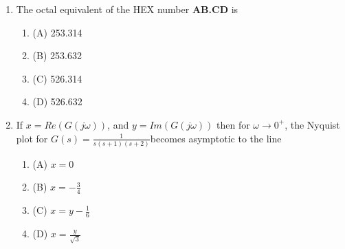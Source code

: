 \documentclass[journal]{IEEEtran}
\numberwithin{equation}{enumi}
\numberwithin{figure}{enumi}
\begin{document}
\begin{enumerate}
\begin{multicols}{4}
\begin{enumerate}
        \item $25^\circ$
        \item $-30^\circ$
        \item $30^\circ$
    \end{enumerate}
    \end{multicols}
    \bigskip
    \item The octal equivalent of the HEX number \textbf{AB.CD} is
    \begin{multicols}{4}
    \begin{enumerate}
        \item (A) 253.314
        \item (B) 253.632
        \item (C) 526.314
        \item (D) 526.632
    \end{enumerate}
    \end{multicols}
    \bigskip
    \item If $x = Re(G(j\omega))$, and $y = Im(G(j\omega))$ then for $ \omega \to 0^{+} $, the Nyquist plot for $G(s) = \frac{1}{s(s+1)(s+2)}$becomes asymptotic to the line
    \begin{multicols}{4}
    \begin{enumerate}
        \item (A) $x = 0$
        \item (B) $x = -\frac{3}{4}$
        \item (C) $x = y - \frac{1}{6}$
        \item (D) $x = \frac{y}{\sqrt{3}}$
    \end{enumerate}
    \end{multicols}
    \bigskip

\end{enumerate}
\end{document}
